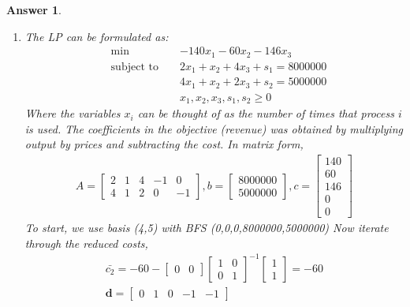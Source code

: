 \documentclass[12pt]{article}
\theoremstyle{colon}
\newtheorem*{answer}{Answer}
\begin{document}
\begin{answer}
  \begin{enumerate}[label=\arabic*)]
    \item The LP can be formulated as:
      \begin{align*}
        &\min &&-140x_1 - 60x_2 - 146x_3 \\
        &\text{subject to } &&2x_1 + x_2 +4x_3 + s_1 = 8000000 \\
        & &&4x_1 + x_2 + 2x_3 + s_2 = 5000000 \\
        & &&x_1, x_2, x_3, s_1, s_2 \geq 0
      \end{align*}
      Where the variables $x_i$ can be thought of as the number of times that process $i$ is used. The coefficients in the objective (revenue) was obtained by multiplying output by prices and subtracting the cost.
      In matrix form,
      \begin{gather*}
        A = \begin{bmatrix}
          2 & 1 & 4 & -1 & 0 \\
          4 & 1 & 2 & 0 & -1
        \end{bmatrix}, b = \begin{bmatrix}
          8000000 \\
          5000000
        \end{bmatrix}, c = \begin{bmatrix}
          140 \\
          60 \\
          146 \\
          0 \\
          0
        \end{bmatrix}
      \end{gather*}
      To start, we use basis (4,5) with BFS (0,0,0,8000000,5000000)
      Now iterate through the reduced costs,
      \begin{gather*}
        \bar{c_2} = -60 - \begin{bmatrix} 0 & 0 \end{bmatrix}\begin{bmatrix}
          1 & 0 \\
          0 & 1
        \end{bmatrix}^{-1} \begin{bmatrix} 1 \\ 1 \end{bmatrix} = -60 \\
        \textbf{d} = \begin{bmatrix} 0 & 1 & 0 & -1 & -1 \end{bmatrix} \\

\end{gather*}
\end{enumerate}
\end{answer}
\end{document}
